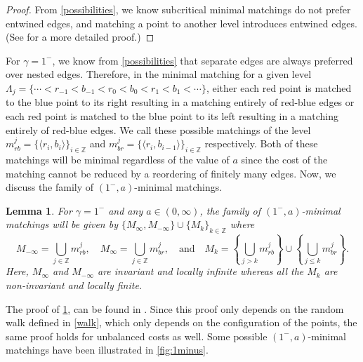 \documentclass{article}
\newtheorem{lemma}{Lemma}
\newcommand{\Z}{{\mathbb Z}}
\begin{document}
\begin{proof}
 From \cref{possibilities}, we know subcritical minimal matchings do
  not prefer entwined edges, and matching a point to another level
  introduces entwined edges. (See \cite[Section 4]{minimal} for a
 more detailed proof.)
\end{proof}

For $\gamma=1^-$, we know from \cref{possibilities} that separate
edges are always preferred over nested edges. Therefore, in the minimal
matching for a given level $\Lambda_j = \{\cdots<r_{-1}<b_{-1}<r_{0}<b_0<r_1<b_1<\cdots\}$, either each red point is matched to the blue point to its right
resulting in a matching entirely of red-blue edges or each red point
is matched to the blue point to its left resulting in a matching
 entirely of red-blue edges.  We call these possible matchings of the
 level $m^j_{rb} = \{\langle r_i,b_i \rangle\}_{i\in\Z}$ and  $
 m^j_{br} = \{\langle r_i,b_{i-1} \rangle\}_{i\in\Z}$ respectively.
 Both of these matchings
will be minimal regardless of the value of $a$ since the cost of the matching cannot be
reduced by a reordering of finitely many edges. Now, we discuss the
family of
$(1^-,a)$-minimal matchings.

\begin{lemma}\label{lem:1minus}
  For $\gamma=1^-$ and any $a\in(0,\infty)$, the family of
  $(1^-,a)$-minimal matchings will be given by
  $\{M_\infty,M_{-\infty}\}\cup\{M_k\}_{k\in\Z}$ where
  \begin{equation}
    \label{eq:1minus}
    M_{-\infty}  = \bigcup_{j\in\Z} m^j_{rb} , \quad
    M_{\infty} = \bigcup_{j\in\Z} m^j_{br} ,  \quad  \mbox{and} \quad M_k  =\left\{\bigcup_{j>k}
  m^j_{rb} \right\} \cup \left\{\bigcup_{j\leq k} m^j_{br}\right\}.
  \end{equation}
Here, $M_\infty$ and $M_{-\infty}$ are invariant and locally infinite
whereas all the $M_{k}$ are non-invariant and locally finite.
\end{lemma}

The proof of \cref{lem:1minus}, can be found in \cite[Section 5, Theorem
2(iii)]{minimal}. Since this proof only depends on the
random walk defined in \eqref{walk}, which only depends on the
configuration of the points, the same proof holds for unbalanced costs
as well.  Some possible
$(1^-,a)$-minimal matchings have been illustrated in \cref{fig:1minus}.
\end{document}
